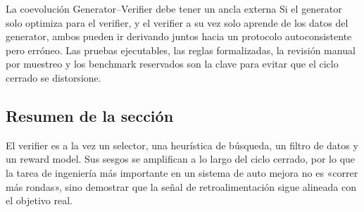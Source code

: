 \begin{importantbox}{La coevolución Generator--Verifier debe tener un ancla externa}
Si el generator solo optimiza para el verifier, y el verifier a su vez solo aprende de los datos del generator, ambos pueden ir derivando juntos hacia un protocolo autoconsistente pero erróneo. Las pruebas ejecutables, las reglas formalizadas, la revisión manual por muestreo y los benchmark reservados son la clave para evitar que el ciclo cerrado se distorsione.
\end{importantbox}

\subsection{Resumen de la sección}

El verifier es a la vez un selector, una heurística de búsqueda, un filtro de datos y un reward model. Sus sesgos se amplifican a lo largo del ciclo cerrado, por lo que la tarea de ingeniería más importante en un sistema de auto mejora no es «correr más rondas», sino demostrar que la señal de retroalimentación sigue alineada con el objetivo real.

